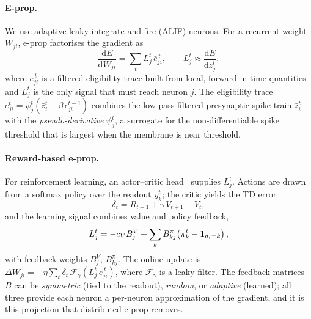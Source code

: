 \documentclass[10pt,twocolumn]{article}
\begin{document}
\paragraph{E-prop.}
We use adaptive leaky integrate-and-fire (ALIF) neurons. For a recurrent weight
$W_{ji}$, e-prop factorises the gradient as
\begin{equation}
\frac{\mathrm{d}E}{\mathrm{d}W_{ji}} = \sum_t L^t_j\,\bar{e}^{\,t}_{ji},
\qquad L^t_j \approx \frac{\mathrm{d}E}{\mathrm{d}z^t_j},
\label{eq:eprop-factorisation}
\end{equation}
where $\bar e^{\,t}_{ji}$ is a filtered eligibility trace built from local,
forward-in-time quantities and $L^t_j$ is the only signal that must reach
neuron $j$. The eligibility trace $e^t_{ji}=\psi^t_j(\bar z^t_i-\beta\,
\epsilon^{t-1}_{ji})$ combines the low-pass-filtered presynaptic spike train
$\bar z^t_i$ with the \emph{pseudo-derivative} $\psi^t_j$, a surrogate for the
non-differentiable spike threshold that is largest when the membrane is near
threshold.

\paragraph{Reward-based e-prop.}
For reinforcement learning, an actor--critic head~\citep{Konda2000ActorCritic} supplies $L^t_j$. Actions are
drawn from a softmax policy over the readout $y^t_k$; the critic yields the
TD error
\begin{equation}
\delta_t = R_{t+1} + \gamma\, V_{t+1} - V_t,
\label{eq:tderror}
\end{equation}
and the learning signal combines value and policy feedback,
\begin{equation}
L^t_j = -c_V B^V_j + \sum_k B^\pi_{kj}\!\left(\pi^t_k - \mathbbm{1}_{a_t=k}\right),
\label{eq:learning-signal}
\end{equation}
with feedback weights $B^V_j$, $B^\pi_{kj}$. The online update is
$\Delta W_{ji} = -\eta\sum_t \delta_t\,\mathcal{F}_{\gamma}(L^t_j\,\bar
e^{\,t}_{ji})$, where $\mathcal{F}_{\gamma}$ is a leaky filter. The feedback
matrices $B$ can be \emph{symmetric} (tied to the readout), \emph{random}, or
\emph{adaptive} (learned); all three provide each neuron a per-neuron
approximation of the gradient, and it is this projection that distributed
e-prop removes.
\end{document}
